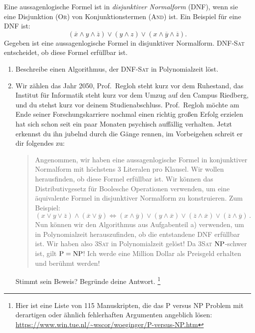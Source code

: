 \documentclass{uebung_cs}
\begin{document}
\begin{exercise}[DNF Erfüllbarkeit][\athome]
	Eine aussagenlogische Formel ist in \textit{disjunktiver Normalform} (DNF), wenn sie eine Disjunktion (\textsc{Or}) von Konjunktionstermen (\textsc{And}) ist. Ein Beispiel für eine DNF ist:
	$$(\overline{x} \wedge y \wedge \overline{z}) \vee (y \wedge z) \vee (x \wedge \overline{y} \wedge \overline{z}).$$
	Gegeben ist eine aussagenlogische Formel in disjunktiver Normalform. DNF-\textsc{Sat} entscheidet, ob diese Formel erfüllbar ist.
	\begin{enumerate}
		\item\easy Beschreibe einen Algorithmus, der DNF-\textsc{Sat} in Polynomialzeit  löst.
		\item\medium Wir zählen das Jahr 2050, Prof.\ Regloh steht kurz vor dem Ruhestand, das Institut für Informatik steht kurz vor dem Umzug auf den Campus Riedberg, und du stehst kurz vor deinem Studienabschluss. Prof.\ Regloh möchte am Ende seiner Forschungskarriere nochmal einen richtig großen Erfolg erzielen hat sich schon seit ein paar Monaten psychisch auffällig verhalten. Jetzt erkennst du ihn jubelnd durch die Gänge rennen, im Vorbeigehen schreit er dir folgendes zu:
		      \begin{quote}
			      Angenommen, wir haben eine aussagenlogische Formel in konjunktiver Normalform mit höchstens 3 Literalen pro Klausel. Wir wollen herausfinden, ob diese Formel erfüllbar ist. Wir können das Distributivgesetz für Boolesche Operationen verwenden, um eine äquivalente Formel in disjunktiver Normalform zu konstruieren. Zum Beispiel:
			      \[(x \vee y \vee \overline{z}) \wedge (\overline{x} \vee \overline{y}) \Leftrightarrow (x \wedge \overline{y}) \vee (y \wedge \overline{x}) \vee (\overline{z} \wedge \overline{x}) \vee (\overline{z} \wedge \overline{y})\,.\]
			      Nun können wir den Algorithmus aus Aufgabenteil a) verwenden, um in Polynomialzeit herauszufinden, ob die entstandene DNF erfüllbar ist. Wir haben also \textsc{3Sat} in Polynomialzeit gelöst! Da \textsc{3Sat} $\mathrm{NP}$-schwer ist, gilt $\mathrm{P} = \mathrm{NP}$! Ich werde eine Million Dollar als Preisgeld erhalten und berühmt werden!
		      \end{quote}
			  Stimmt sein Beweis? Begründe deine Antwort.%
			  \footnote{Hier ist eine Liste von 115 Manuskripten, die das P versus NP Problem mit derartigen oder ähnlich fehlerhaften Argumenten angeblich lösen: \url{https://www.win.tue.nl/~wscor/woeginger/P-versus-NP.htm}}
	\end{enumerate}
\end{exercise}
\newpage
\end{document}
